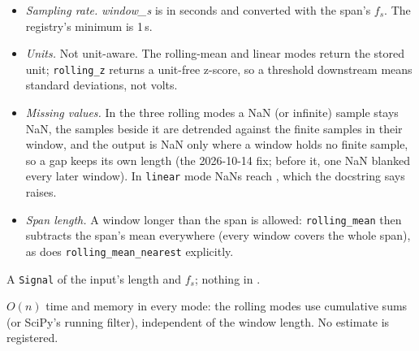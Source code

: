 \begin{itemize}
\item \emph{Sampling rate.} \emph{window\_s} is in seconds and converted with the span's
  $f_s$. The registry's minimum is 1\,s.
\item \emph{Units.} Not unit-aware. The rolling-mean and linear modes return the stored
  unit; \texttt{rolling\_z} returns a unit-free z-score, so a threshold downstream means
  standard deviations, not volts.
\item \emph{Missing values.} In the three rolling modes a NaN (or infinite) sample stays NaN,
  the samples beside it are detrended against the finite samples in their window, and the
  output is NaN only where a window holds no finite sample, so a gap keeps its own length
  (the 2026-10-14 fix; before it, one NaN blanked every later window). In \texttt{linear} mode
  NaNs reach , which the docstring says raises.
\item \emph{Span length.} A window longer than the span is allowed: \texttt{rolling\_mean}
  then subtracts the span's mean everywhere (every window covers the whole span), as does
  \texttt{rolling\_mean\_nearest} explicitly.
\end{itemize}

A \texttt{Signal} of the input's length and $f_s$; nothing in .

$O(n)$ time and memory in every mode: the rolling modes use cumulative sums (or SciPy's running
filter), independent of the window length. No estimate is registered.

